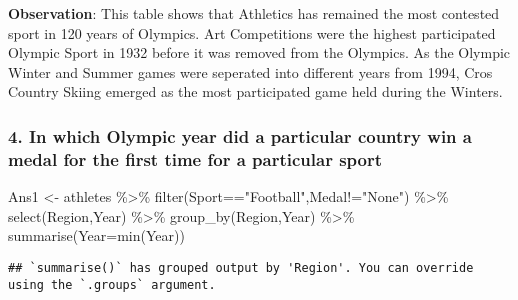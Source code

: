 \documentclass[
]{article}
\newenvironment{Shaded}{\begin{snugshade}}{\end{snugshade}}
\newcommand{\AttributeTok}[1]{\textcolor[rgb]{0.77,0.63,0.00}{#1}}
\newcommand{\FunctionTok}[1]{\textcolor[rgb]{0.00,0.00,0.00}{#1}}
\newcommand{\NormalTok}[1]{#1}
\newcommand{\OtherTok}[1]{\textcolor[rgb]{0.56,0.35,0.01}{#1}}
\newcommand{\SpecialCharTok}[1]{\textcolor[rgb]{0.00,0.00,0.00}{#1}}
\newcommand{\StringTok}[1]{\textcolor[rgb]{0.31,0.60,0.02}{#1}}
\begin{document}
\textbf{Observation}: This table shows that Athletics has remained the
most contested sport in 120 years of Olympics. Art Competitions were the
highest participated Olympic Sport in 1932 before it was removed from
the Olympics. As the Olympic Winter and Summer games were seperated into
different years from 1994, Cros Country Skiing emerged as the most
participated game held during the Winters.

\hypertarget{in-which-olympic-year-did-a-particular-country-win-a-medal-for-the-first-time-for-a-particular-sport}{%
\subsubsection{4. In which Olympic year did a particular country win a
medal for the first time for a particular
sport}\label{in-which-olympic-year-did-a-particular-country-win-a-medal-for-the-first-time-for-a-particular-sport}}

\begin{Shaded}
\begin{Highlighting}[]
\NormalTok{Ans1 }\OtherTok{\textless{}{-}}
\NormalTok{athletes }\SpecialCharTok{\%\textgreater{}\%}
\FunctionTok{filter}\NormalTok{(Sport}\SpecialCharTok{==}\StringTok{"Football"}\NormalTok{,Medal}\SpecialCharTok{!=}\StringTok{"None"}\NormalTok{) }\SpecialCharTok{\%\textgreater{}\%}
\FunctionTok{select}\NormalTok{(Region,Year) }\SpecialCharTok{\%\textgreater{}\%}
\FunctionTok{group\_by}\NormalTok{(Region,Year) }\SpecialCharTok{\%\textgreater{}\%}
\FunctionTok{summarise}\NormalTok{(}\AttributeTok{Year=}\FunctionTok{min}\NormalTok{(Year))}
\end{Highlighting}
\end{Shaded}

\begin{verbatim}
## `summarise()` has grouped output by 'Region'. You can override using the `.groups` argument.
\end{verbatim}

\begin{Shaded}
\end{Shaded}
\end{document}
